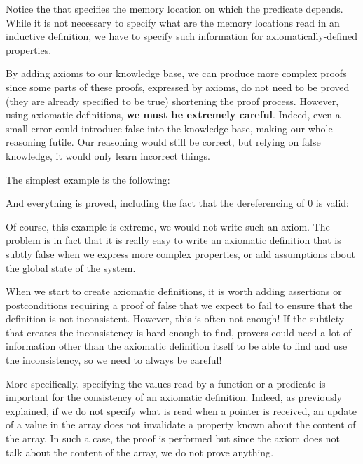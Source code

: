 


Notice the  that specifies the memory location
on which the predicate depends. While it is not necessary to specify what are
the memory locations read in an inductive definition, we have to specify such
information for axiomatically-defined properties.




By adding axioms to our knowledge base, we can produce more complex
proofs since some parts of these proofs, expressed by axioms, do not need
to be proved (they are already specified to be true) shortening
the proof process. However, using axiomatic definitions, \textbf{we must
be extremely careful}. Indeed, even a small error could introduce false
into the knowledge base, making our whole reasoning futile. Our reasoning
would still be correct, but relying on false knowledge, it would only
learn incorrect things.



The simplest example is the following:






And everything is proved, including the fact that the dereferencing of
0 is valid:





Of course, this example is extreme, we would not write such an axiom.
The problem is in fact that it is really easy to write an axiomatic
definition that is subtly false when we express more complex properties,
or add assumptions about the global state of the system.







When we start to create axiomatic definitions, it is worth adding
assertions or postconditions requiring a proof of false that we expect
to fail to ensure that the definition is not inconsistent. However,
this is often not enough! If the subtlety that creates the inconsistency is
hard enough to find, provers could need a lot of information other than
the axiomatic definition itself to be able to find and use the
inconsistency, so we need to always be careful!




More specifically, specifying the values read by a function or a
predicate is important for the consistency of an axiomatic definition.
Indeed, as previously explained, if we do not specify what is read when
a pointer is received, an update of a value in the array does not
invalidate a property known about the content of the array. In such a
case, the proof is performed but since the axiom does not talk about the
content of the array, we do not prove anything.




